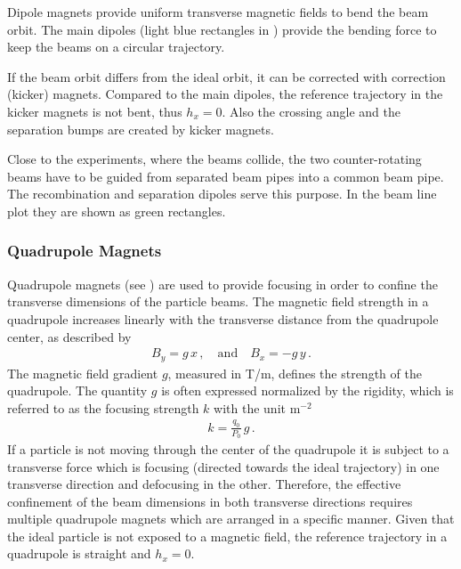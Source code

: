 Dipole magnets provide uniform transverse magnetic fields to bend the beam orbit. The main dipoles (light blue rectangles in ) provide the bending force to keep the beams on a circular trajectory. 

If the beam orbit differs from the ideal orbit, it can be corrected with correction (kicker) magnets. Compared to the main dipoles, the reference trajectory in the kicker magnets is not bent, thus $h_x=0$. Also the crossing angle and the separation bumps are created by kicker magnets.  

Close to the experiments, where the beams collide, the two counter-rotating beams have to be guided from separated beam pipes into a common beam pipe. The recombination and separation dipoles serve this purpose. In the beam line plot they are shown as green rectangles.

\subsubsection{Quadrupole Magnets} \label{quad:intro}

Quadrupole magnets (see ) are used to provide focusing in order to confine the transverse dimensions of the particle beams. The magnetic field strength in a quadrupole increases linearly with the transverse distance from the quadrupole center, as described by
\begin{align}
B_y = g \, x \, , \quad \text{and} \quad B_x = - g \, y \, .
\end{align}
The magnetic field gradient $g$, measured in T/m, defines the strength of the quadrupole. The quantity $g$ is often expressed normalized by the rigidity, which is referred to as the focusing strength $k$ with the unit m$^{-2}$
%
\begin{align}
  k = \frac{q_0}{P_0} \, g \, . \label{norm:quadstr}
\end{align}
%
If a particle is not moving through the center of the quadrupole it is subject to a transverse force which is focusing (directed towards the ideal trajectory) in one transverse direction and defocusing in the other. Therefore, the effective confinement of the beam dimensions in both transverse directions requires multiple quadrupole magnets which are arranged in a specific manner. Given that the ideal particle is not exposed to a magnetic field, the reference trajectory in a quadrupole is straight and $h_x=0$. 

